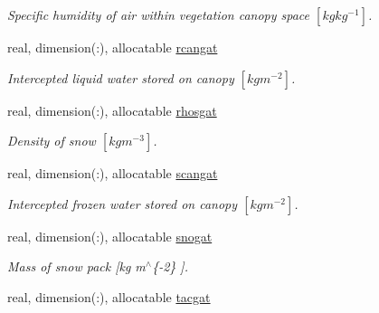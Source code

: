 \begin{DoxyCompactItemize}
\begin{DoxyCompactList}\small\item\em Specific humidity of air within vegetation canopy space $[kg kg^{-1} ]$. \end{DoxyCompactList}\item 
\hypertarget{structclass__statevars_1_1class__gather_ab704d27b1dc87a02915ac8e30e603edc}{}real, dimension(\+:), allocatable \hyperlink{structclass__statevars_1_1class__gather_ab704d27b1dc87a02915ac8e30e603edc}{rcangat}\label{structclass__statevars_1_1class__gather_ab704d27b1dc87a02915ac8e30e603edc}

\begin{DoxyCompactList}\small\item\em Intercepted liquid water stored on canopy $[kg m^{-2} ]$. \end{DoxyCompactList}\item 
\hypertarget{structclass__statevars_1_1class__gather_a467e3039539b307407801349523a0e66}{}real, dimension(\+:), allocatable \hyperlink{structclass__statevars_1_1class__gather_a467e3039539b307407801349523a0e66}{rhosgat}\label{structclass__statevars_1_1class__gather_a467e3039539b307407801349523a0e66}

\begin{DoxyCompactList}\small\item\em Density of snow $[kg m^{-3} ]$. \end{DoxyCompactList}\item 
\hypertarget{structclass__statevars_1_1class__gather_aacd8b7a137f569cc620532a63e5d365f}{}real, dimension(\+:), allocatable \hyperlink{structclass__statevars_1_1class__gather_aacd8b7a137f569cc620532a63e5d365f}{scangat}\label{structclass__statevars_1_1class__gather_aacd8b7a137f569cc620532a63e5d365f}

\begin{DoxyCompactList}\small\item\em Intercepted frozen water stored on canopy $[kg m^{-2} ]$. \end{DoxyCompactList}\item 
\hypertarget{structclass__statevars_1_1class__gather_a64a99a1ae0e2677911aa3c974a87ca1b}{}real, dimension(\+:), allocatable \hyperlink{structclass__statevars_1_1class__gather_a64a99a1ae0e2677911aa3c974a87ca1b}{snogat}\label{structclass__statevars_1_1class__gather_a64a99a1ae0e2677911aa3c974a87ca1b}

\begin{DoxyCompactList}\small\item\em Mass of snow pack \mbox{[}kg m$^\wedge$\{-\/2\} \mbox{]}. \end{DoxyCompactList}\item 
\hypertarget{structclass__statevars_1_1class__gather_ac72504cca8e992b8350bf11cfa4c350f}{}real, dimension(\+:), allocatable \hyperlink{structclass__statevars_1_1class__gather_ac72504cca8e992b8350bf11cfa4c350f}{tacgat}\label{structclass__statevars_1_1class__gather_ac72504cca8e992b8350bf11cfa4c350f}


\end{DoxyCompactItemize}
